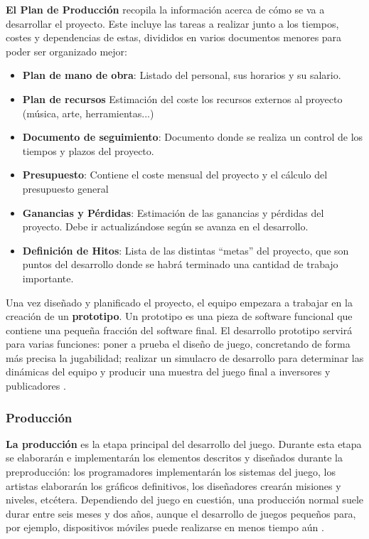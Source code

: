 \textbf{El Plan de Producción} recopila la información acerca de cómo se va a desarrollar el proyecto. Este incluye las tareas a realizar junto a los tiempos, costes y dependencias de estas, divididos en varios documentos menores para poder ser organizado mejor:
\begin{itemize}
\item \textbf{Plan de mano de obra}: Listado del personal, sus horarios y su salario.
\item \textbf{Plan de recursos} Estimación del coste los recursos externos al proyecto (música, arte, herramientas...)
\item \textbf{Documento de seguimiento}: Documento donde se realiza un control de los tiempos y plazos del proyecto.
\item \textbf{Presupuesto}: Contiene el coste mensual del proyecto y el cálculo del presupuesto general
\item \textbf{Ganancias y Pérdidas}: Estimación  de las ganancias y  pérdidas del proyecto. Debe ir actualizándose según se avanza en el desarrollo.
\item \textbf{Definición de Hitos}: Lista de las distintas ``metas'' del proyecto, que son puntos del desarrollo donde se habrá terminado una cantidad de trabajo importante.
\end{itemize}

Una vez diseñado y planificado el proyecto, el equipo empezara a trabajar en la creación de un \textbf{prototipo}. Un prototipo es una pieza de software funcional que contiene una pequeña fracción del software final. El desarrollo prototipo servirá para varias funciones: poner a prueba el diseño de juego, concretando de forma más precisa la jugabilidad; realizar un simulacro de desarrollo para determinar las dinámicas del equipo y producir una muestra del juego final a inversores y publicadores \cite{game_design_2}. 

\subsubsection{Producción}
\textbf{La producción} es la etapa principal del desarrollo del juego. Durante esta etapa se elaborarán e implementarán los elementos descritos y diseñados durante la preproducción: los programadores implementarán los sistemas del juego, los artistas elaborarán los gráficos definitivos, los diseñadores crearán misiones y niveles, etcétera. Dependiendo del juego en cuestión, una producción normal suele durar entre seis meses y dos años, aunque el desarrollo de juegos pequeños para, por ejemplo, dispositivos móviles puede realizarse en menos tiempo aún \cite{development_and_production}.

